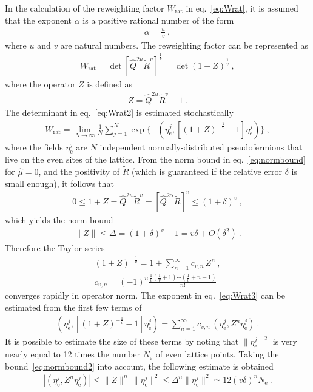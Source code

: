 \documentclass[11pt,fleqn]{article}
\newcommand{\R}{\tilde{R}}
\begin{document}
In the calculation of the reweighting factor $W_\text{rat}$ in eq.~\eqref{eq:Wrat}, it is assumed that the exponent $\alpha$ is a positive rational number of the form
\begin{gather}
   \alpha = \frac{u}{v} \ ,
\end{gather}
where $u$ and $v$ are natural numbers. The reweighting factor can be represented as
\begin{gather}
   W_\text{rat} = \det [ \hat{Q}^{2u} \R^v ]^{\frac{1}{v}}
   =
   \det (1 + Z)^{\frac{1}{v}} \ ,
   \label{eq:Wrat2}
\end{gather}
where the operator $Z$ is defined as
\begin{gather}
   Z = \hat{Q}^{2u} \R^v - 1 \ .
   \label{eq:zeta}
\end{gather}
The determinant in eq.~\eqref{eq:Wrat2} is estimated stochastically
\begin{gather}
   W_\text{rat} = \lim_{N \to \infty} \frac{1}{N} \sum_{j=1}^N \exp \{ - ( \eta^j_\text{e} , [ (1 + Z)^{-\frac{1}{v}} - 1 ] \eta^j_\text{e} ) \}
   \ ,
   \label{eq:Wrat3}
\end{gather}
where the fields $\eta^j_\text{e}$ are $N$ independent normally-distributed pseudofermions that live on the even sites of the lattice. From the norm bound in eq.~\eqref{eq:normbound} for $\hat{\mu}=0$, and the positivity of $\R$ (which is guaranteed if the relative error $\delta$ is small enough), it follows that
\begin{gather}
   0 \le 1+Z = \hat{Q}^{2u} \R^v = [ \hat{Q}^{2\alpha} \R]^v \le (1 + \delta)^v \ ,
\end{gather}
which yields the norm bound
\begin{gather}
   \| Z \| \le \Delta = (1 + \delta)^v - 1 = v \delta + O(\delta^2) \ .
   \label{eq:normbound2}
\end{gather}
Therefore the Taylor series
\begin{gather}
   (1 + Z)^{-\frac{1}{v}} = 1 + \sum_{n=1}^\infty c_{v,n} \, Z^n \ , \\
   c_{v,n} = (-1)^n \frac{\tfrac{1}{v} (\tfrac{1}{v}+1) \cdots (\tfrac{1}{v} + n - 1)}{n!}
\end{gather}
converges rapidly in operator norm. The exponent in eq.~\eqref{eq:Wrat3} can be estimated from the first few terms of
\begin{gather}
   ( \eta^j_\text{e} , [ (1 + Z)^{-\frac{1}{v}} - 1 ] \eta^j_\text{e} ) = \sum_{n=1}^\infty
   c_{v,n} \, ( \eta^j_\text{e} , Z^n \eta^j_\text{e} )  \ .
\end{gather}
It is possible to estimate the size of these terms by noting that $\| \eta^j_\text{e} \|^2$ is very nearly equal to 12 times the number $N_\text{e}$ of even lattice points. Taking the bound~\eqref{eq:normbound2} into account, the following estimate is obtained
\begin{gather}
   | ( \eta^j_\text{e} , Z^n \eta^j_\text{e} ) | \le \| Z \|^n \, \| \eta^j_\text{e} \|^2
   \le
   \Delta^n \| \eta^j_\text{e} \|^2
   \simeq
   12 (v \delta)^n N_\text{e}
   \ .
\end{gather}
\end{document}
